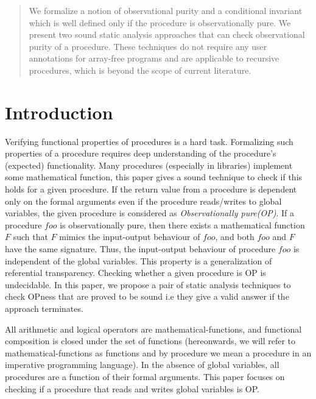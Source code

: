 \documentclass{llncs}
\newcommand{\foo}{\textit{foo}}
\newcommand{\F}{\mathit{F}}
\begin{document}
\begin{abstract}
  We formalize a notion of observational purity and a conditional
  invariant which is well defined only if the procedure is
  observationally pure.  We present two sound static analysis
  approaches that can check observational purity of a procedure. These
  techniques do not require any user annotations for array-free
  programs and are applicable to recursive procedures, which is beyond
  the scope of current literature.

\end{abstract}

\section{Introduction}
Verifying functional properties of procedures is a hard task.
Formalizing such properties of a procedure requires deep understanding
of the procedure's (expected) functionality. Many procedures
(especially in libraries) implement some mathematical
function, this paper gives a sound technique to check if this holds
for a given procedure. If the return value from a procedure is
dependent only on the formal arguments even if the procedure
reads/writes to global variables, the given procedure is considered as
\textit{Observationally pure(OP)}.  If a procedure $\foo$ is
observationally pure, then there exists a mathematical function $\F$
such that $\F$ mimics the input-output behaviour of $\foo$, and both
$\foo$ and $\F$ have the same signature.  Thus, the input-output
behaviour of procedure $\foo$ is independent of the
global variables. This property is a generalization of referential
transparency. 
Checking whether a given procedure is OP is undecidable. In this
paper, we propose a pair of static analysis techniques to check OPness
that are proved to be sound i.e they give a valid answer if the
approach terminates.

All arithmetic and logical operators are mathematical-functions, and
functional composition is closed under the set of functions
(hereonwards, we will refer to mathematical-functions as functions and
by procedure we mean a procedure in an imperative programming
language).  In the absence of global variables, all procedures are a
function of their formal arguments. This paper focuses on checking if
a procedure that reads and writes global variables is OP.
\end{document}
